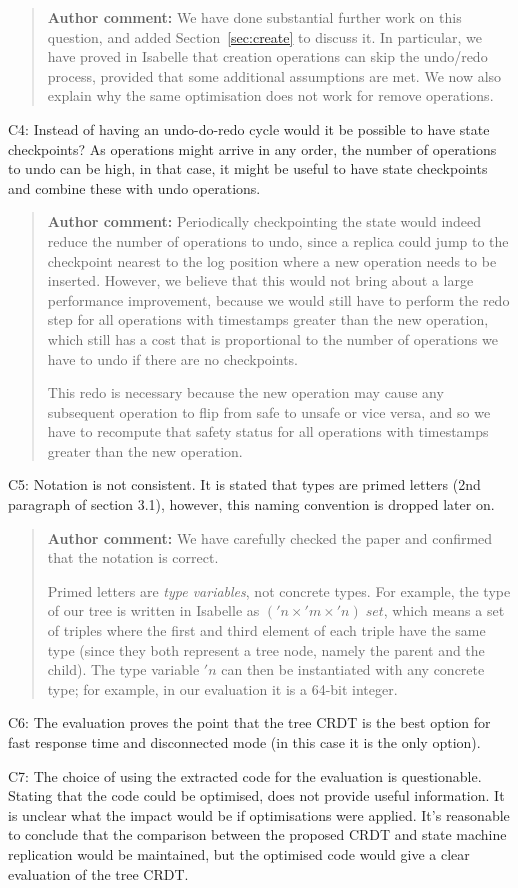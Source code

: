 \documentclass[10pt]{article}
\newcommand{\authorcomment}[1]{\begin{quote}\textbf{Author comment:} #1\end{quote}}
\begin{document}
\authorcomment{We have done substantial further work on this question, and added Section~\ref{sec:create} to discuss it.
In particular, we have proved in Isabelle that creation operations can skip the undo/redo process, provided that some additional assumptions are met.
We now also explain why the same optimisation does not work for remove operations.}
\begin{spverbatim}
C4: Instead of having an undo-do-redo cycle would it be possible to have state checkpoints? As operations might arrive in any order, the number of operations to undo can be high, in that case, it might be useful to have state checkpoints and combine these with undo operations.
\end{spverbatim}
\authorcomment{Periodically checkpointing the state would indeed reduce the number of operations to undo, since a replica could jump to the checkpoint nearest to the log position where a new operation needs to be inserted.
However, we believe that this would not bring about a large performance improvement, because we would still have to perform the redo step for all operations with timestamps greater than the new operation, which still has a cost that is proportional to the number of operations we have to undo if there are no checkpoints.

This redo is necessary because the new operation may cause any subsequent operation to flip from safe to unsafe or vice versa, and so we have to recompute that safety status for all operations with timestamps greater than the new operation.}
\begin{spverbatim}
C5: Notation is not consistent. It is stated that types are primed letters (2nd paragraph of section 3.1), however, this naming convention is dropped later on.
\end{spverbatim}
\authorcomment{We have carefully checked the paper and confirmed that the notation is correct.

Primed letters are \emph{type variables}, not concrete types.
For example, the type of our tree is written in Isabelle as $('n \times '\!m \times '\!n)\;\mathit{set}$, which means a set of triples where the first and third element of each triple have the same type (since they both represent a tree node, namely the parent and the child). 
The type variable $'n$ can then be instantiated with any concrete type; for example, in our evaluation it is a 64-bit integer.}
\begin{spverbatim}
C6: The evaluation proves the point that the tree CRDT is the best option for fast response time and disconnected mode (in this case it is the only option).

C7: The choice of using the extracted code for the evaluation is questionable. Stating that the code could be optimised, does not provide useful information. It is unclear what the impact would be if optimisations were applied. It's reasonable to conclude that the comparison between the proposed CRDT and state machine replication would be maintained, but the optimised code would give a clear evaluation of the tree CRDT.
\end{spverbatim}
\end{document}
